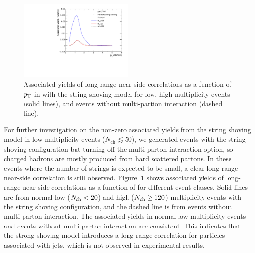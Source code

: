 \begin{figure}[!h]
\includegraphics[width=0.5\textwidth]{figures/mpi2.pdf}
\caption{Associated yields of long-range near-side correlations as a function of $\mbox{$p_{\mathrm{T}}$}$ in \pythia with the string shoving model for low, high multiplicity events (solid lines), and events without multi-partion interaction (dashed line). }\label{fig:wompi}
\end{figure}

For further investigation on the non-zero associated yields from the string shoving model in low multiplicity events ($N_\mathrm{ch}\lesssim 50$), we generated \pythia events with the string shoving configuration but turning off the multi-parton interaction option, so charged hadrons are mostly produced from hard scattered partons.
In these events where the number of strings is expected to be small, a clear long-range near-side correlation is still observed.
Figure~\ref{fig:wompi} shows associated yields of long-range near-side correlations as a function of \pt for different event classes.
Solid lines are from normal low ($\mbox{$N_\mathrm{ch}$}<20$) and high ($\mbox{$N_\mathrm{ch}$} \geq 120$) multiplicity \pythia events with the string shoving configuration, and the dashed line is from events without multi-parton interaction.
The associated yields in normal low multiplicity events and events without multi-parton interaction are consistent. 
This indicates that the strong shoving model introduces a long-range correlation for particles associated with jets, which is not observed in experimental results.



